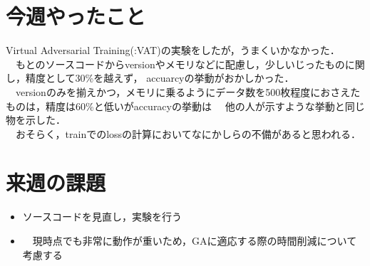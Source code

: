 \documentclass[twocolumn]{jarticle}     %
\begin{document}


\section{今週やったこと}

Virtual Adversarial Training(:VAT)の実験をしたが，うまくいかなかった．\\
　もとのソースコードからversionやメモリなどに配慮し，少しいじったものに関し，精度として30\%を越えず，
accuarcyの挙動がおかしかった．\\
　versionのみを揃えかつ，メモリに乗るようにデータ数を500枚程度におさえたものは，精度は60\%と低いがaccuracyの挙動は
　他の人が示すような挙動と同じ物を示した．\\
　おそらく，trainでのlossの計算においてなにかしらの不備があると思われる．


\section{来週の課題}
\begin{itemize}
	\item ソースコードを見直し，実験を行う
	\item　現時点でも非常に動作が重いため，GAに適応する際の時間削減について考慮する
\end{itemize}
\end{document}
